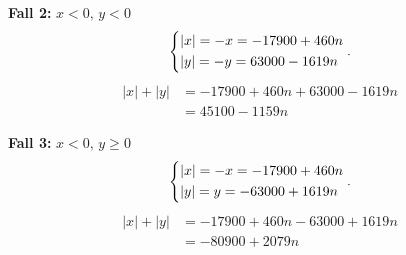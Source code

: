 \documentclass{article}
\begin{document}
\begin{enumerate}[label=(\alph*)]
		\textbf{Fall 2:} $x < 0, \, y < 0$
		\begin{equation*}
			\begin{cases*}
				\lvert x \rvert = -x = -17900 + 460n\\
				\lvert y \rvert = -y = 63000 - 1619n\\
			\end{cases*}.\\
		\end{equation*}
		\begin{align}
			\lvert x \rvert + \lvert y \rvert &= -17900 + 460n + 63000 - 1619n \nonumber\\
							  &= 45100 - 1159n \label{fall2}
		\end{align}


		\textbf{Fall 3:} $x < 0, \, y \geq 0$
		\begin{equation*}
			\begin{cases*}
				\lvert x \rvert = -x = -17900 + 460n\\
				\lvert y \rvert = y = -63000 + 1619n\\
			\end{cases*}.\\
		\end{equation*}
		\begin{align}
			\lvert x \rvert + \lvert y \rvert &= -17900 + 460n - 63000 + 1619n \nonumber\\
							  &= -80900 + 2079n \label{fall3}
		\end{align}


\end{enumerate}
\end{document}
